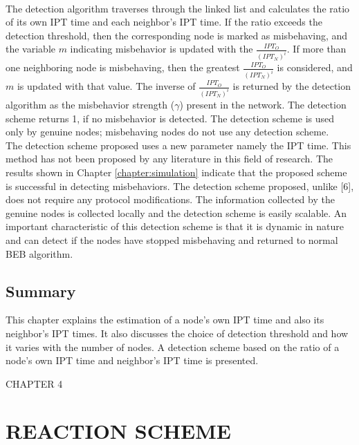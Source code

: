 \documentclass[12pt,letterpaper,english]{article}
\begin{document}
\\
\indent The detection algorithm traverses through the linked list and calculates the ratio of its own IPT time and each neighbor's IPT time. If the ratio exceeds the detection threshold, then the corresponding node is marked as misbehaving, and the variable $m$ indicating misbehavior is updated with the $\frac{IPT_O}{(IPT_N)^i}$. If more than one neighboring node is misbehaving, then the greatest $\frac{IPT_O}{(IPT_N)^i}$ is considered, and $m$ is updated with that value. The inverse of $\frac{IPT_O}{(IPT_N)^i}$ is returned by the detection algorithm as the misbehavior strength ($\gamma$) present in the network.
The detection scheme returns 1, if no misbehavior is detected.
The detection scheme is used only by genuine nodes; misbehaving nodes do not use any detection scheme.
\\
\indent The detection scheme proposed uses a new parameter namely the IPT time. This method has not been proposed by any  literature in this field of research. The results shown in Chapter \ref{chapter:simulation} indicate that the proposed scheme is successful in detecting misbehaviors. The detection scheme proposed, unlike 
[6], 
does not require any protocol modifications. The information collected by the genuine nodes is collected locally and the detection scheme is easily scalable. An important characteristic of this detection scheme is that it is dynamic in nature and can detect if the nodes have stopped misbehaving and returned to normal BEB algorithm. 
\subsection{Summary}
\label{summarydetection}
\indent This chapter explains the estimation of a node's own IPT time and also its neighbor's IPT times. It also discusses the choice of detection threshold and how it varies with the number of nodes. A detection scheme based on the ratio of a node's own IPT time and neighbor's IPT time is presented.
\newpage
\setcounter{figure}{0}
\setcounter{table}{0}
\setcounter{subsection}{0}
\begin{singlespace}
\begin{center}
CHAPTER 4
\section*{REACTION SCHEME}
\addtocounter{section}{1}
\label{chapter:reaction}
\end{center}
\end{singlespace}
\end{document}
